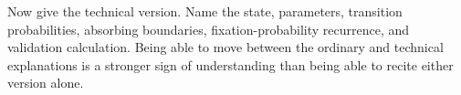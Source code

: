 Now give the technical version. Name the state, parameters, transition
probabilities, absorbing boundaries, fixation-probability recurrence, and
validation calculation. Being able to move between the ordinary and
technical explanations is a stronger sign of understanding than being able
to recite either version alone.
